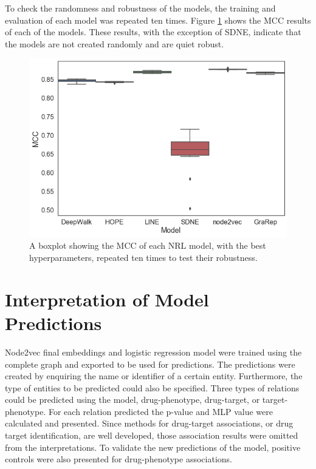 To check the randomness and robustness of the models, the training and evaluation of each model was repeated ten times. Figure \ref{fig:boxplot} shows the \ac{MCC} results of each of the models. These results, with the exception of SDNE, indicate that the models are not created randomly and are quiet robust.

\begin{figure}[h!]
    \centering
    \includegraphics[scale=0.5]
    {figures/boxplot.png}
    \caption[Boxplot of the robustness of NRL models]{\label{fig:boxplot} A boxplot showing the MCC of each NRL model, with the best hyperparameters, repeated ten times to test their robustness.}
\end{figure}

\section{Interpretation of Model Predictions}

Node2vec final embeddings and logistic regression model were trained using the complete graph and exported to be used for predictions. The predictions were created by enquiring the name or identifier of a certain entity. Furthermore, the type of entities to be predicted could also be specified. Three types of relations could be predicted using the model, drug-phenotype, drug-target, or target-phenotype. For each relation predicted the p-value and \ac{MLP} value were calculated and presented. Since methods for drug-target associations, or drug target identification, are well developed, those association results were omitted from the interpretations. To validate the new predictions of the model, positive controls were also presented for drug-phenotype associations.

